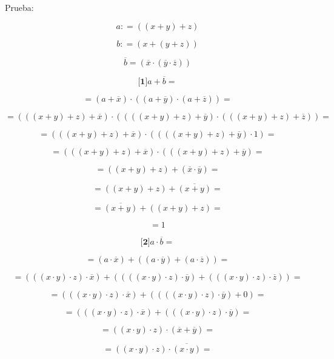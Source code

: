 \begin{enumerate}
\begin{enumerate}
\begin{enumerate}
\begin{enumerate}
        Prueba:

        \[a{: = {({{({x + y})} + z})}}\]

        \[b{: = {({x + {({y + z})}})}}\]

        \[\overline{b}{= {({\overline{x} \cdot {({\overline{y} \cdot \overline{z}})}})}}\]

        \[{\lbrack\mathbf{1}\rbrack}{{a + \overline{b}} =}\]

        \[{= {{({a + \overline{x}})} \cdot {({{({a + \overline{y}})} \cdot {({a + \overline{z}})}})}}} =\]

        \[{= {{({{({{({x + y})} + z})} + \overline{x}})} \cdot {({{({{({{({x + y})} + z})} + \overline{y}})} \cdot {({{({{({x + y})} + z})} + \overline{z}})}})}}} =\]

        \[{= {{({{({{({x + y})} + z})} + \overline{x}})} \cdot {({{({{({{({x + y})} + z})} + \overline{y}})} \cdot 1})}}} =\]

        \[{= {{({{({{({x + y})} + z})} + \overline{x}})} \cdot {({{({{({x + y})} + z})} + \overline{y}})}}} =\]

        \[{= {{({{({x + y})} + z})} + {({\overline{x} \cdot \overline{y}})}}} =\]

        \[{= {{({{({x + y})} + z})} + \overline{({x+y})}}} =\]

        \[{= {\overline{({x+y})} + {({{({x + y})} + z})}}} =\]

        \[= 1\]

        \[{\lbrack\mathbf{2}\rbrack}{{a \cdot \overline{b}} =}\]

        \[{= {{({a \cdot \overline{x}})} + {({{({a \cdot \overline{y}})} + {({a \cdot \overline{z}})}})}}} =\]

        \[{= {{({{({{({x \cdot y})} \cdot z})} \cdot \overline{x}})} + {({{({{({{({x \cdot y})} \cdot z})} \cdot \overline{y}})} + {({{({{({x \cdot y})} \cdot z})} \cdot \overline{z}})}})}}} =\]

        \[{= {{({{({{({x \cdot y})} \cdot z})} \cdot \overline{x}})} + {({{({{({{({x \cdot y})} \cdot z})} \cdot \overline{y}})} + 0})}}} =\]

        \[{= {{({{({{({x \cdot y})} \cdot z})} \cdot \overline{x}})} + {({{({{({x \cdot y})} \cdot z})} \cdot \overline{y}})}}} =\]

        \[{= {{({{({x \cdot y})} \cdot z})} \cdot {({\overline{x} + \overline{y}})}}} =\]

        \[{= {{({{({x \cdot y})} \cdot z})} \cdot \overline{({x\cdot y})}}} =\]


\end{enumerate}
\end{enumerate}
\end{enumerate}
\end{enumerate}
